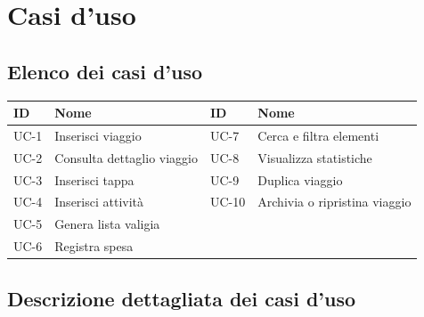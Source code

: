 \documentclass[11pt, a4paper]{article}
\begin{document}
\section{Casi d'uso}

\subsection{Elenco dei casi d'uso}
\begin{table}[h!]
    \centering
    \renewcommand{\arraystretch}{1.3}
    \begin{tabularx}{\textwidth}{l X | l X}
        \toprule
        \textbf{ID} & \textbf{Nome} & \textbf{ID} & \textbf{Nome} \\
        \midrule
        UC-1 & Inserisci viaggio        & UC-7 & Cerca e filtra elementi \\
        UC-2 & Consulta dettaglio viaggio & UC-8 & Visualizza statistiche \\
        UC-3 & Inserisci tappa          & UC-9 & Duplica viaggio \\
        UC-4 & Inserisci attività       & UC-10 & Archivia o ripristina viaggio \\
        UC-5 & Genera lista valigia     & \\
        UC-6 & Registra spesa           &      & \\
        \bottomrule
    \end{tabularx}
\end{table}

\subsection{Descrizione dettagliata dei casi d'uso}
\end{document}
